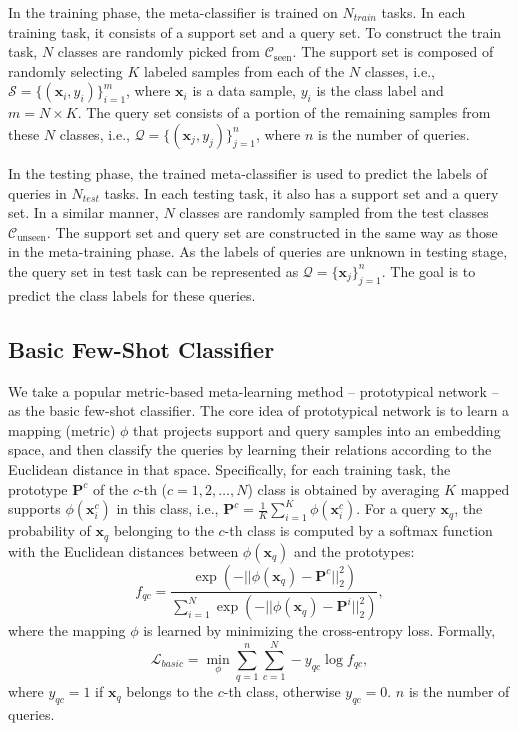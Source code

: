 \documentclass[letterpaper]{article} %
\begin{document}
In the training phase, the meta-classifier is trained on $N_{train}$ tasks. In each training task, it consists of a support set and a query set. To construct the train task, $N$ classes are randomly picked from $\mathcal{C}_\text{seen}$. The support set is composed of randomly selecting $K$ labeled samples from each of the $N$ classes, i.e., $\mathcal{S}=\{(\bm x_i, y_i)\}_{i=1}^m$, where $\bm x_i$ is a data sample, $y_i$ is the class label and $m=N\times K$. The query set consists of a portion of the remaining samples from these $N$ classes, i.e., $\mathcal{Q}=\{(\bm x_j, y_j)\}_{j=1}^n$, where $n$ is the number of queries.

In the testing phase, the trained meta-classifier is used to predict the labels of queries in $N_{test}$ tasks. In each testing task, it also has a support set and a query set. In a similar manner, $N$ classes are randomly sampled from the test classes $\mathcal{C}_\text{unseen}$. The support set and query set are constructed in the same way as those in the meta-training phase. As the labels of queries are unknown in testing stage, the query set in test task can be represented as $\mathcal{Q}=\{\bm x_j\}_{j=1}^n$. The goal is to predict the class labels for these queries.

\subsection{Basic Few-Shot Classifier}\label{basic}
We take a popular metric-based meta-learning method -- prototypical network \cite{snell2017prototypical} -- as the basic few-shot classifier. The core idea of prototypical network is to learn a mapping (metric) $\phi$ that projects support and query samples into an embedding space, and then classify the queries by learning their relations according to the Euclidean distance in that space. Specifically, for each training task, the prototype $\bm P^c$ of the $c$-th ($c=1, 2, \ldots, N$) class is obtained by averaging $K$ mapped supports ${\phi(\bm x_i^c)}$ in this class, i.e., $\bm P^c = \frac1K\sum_{i=1}^K \phi(\bm x_i^c)$. For a query $\bm x_q$, the probability of $\bm x_q$ belonging to the $c$-th class is computed by a softmax function with the Euclidean distances between ${\phi(\bm x_q)}$ and the prototypes:
\begin{equation}\label{PN1}
  f_{qc} = \frac{\exp(-||\phi(\bm x_q) - \bm P^c||_2^2)}{\sum_{i=1}^N \exp(-||\phi(\bm x_q) - \bm P^i||_2^2)},
\end{equation}
where the mapping $\phi$ is learned by minimizing the cross-entropy loss. Formally,
\begin{equation} \label{PN2}
\mathcal{L}_{basic} = \min_{\phi} \sum_{q=1}^{n}\sum_{c=1}^N- y_{qc} \log f_{qc},
\end{equation}
where $y_{qc}=1$ if $\bm x_q$ belongs to the $c$-th class, otherwise $y_{qc}=0$. $n$ is the number of queries.
\end{document}
